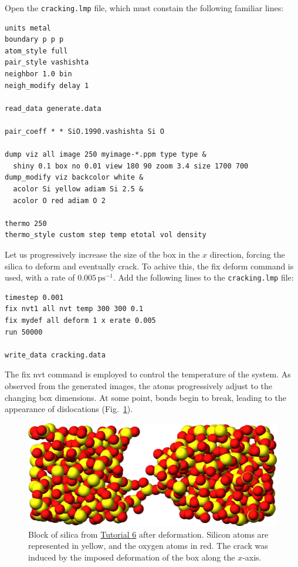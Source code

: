 \documentclass[9pt,tutorial]{livecoms}
\newcommand{\lmpcmd}[1]{\hspace{0pt}\colorbox{listing}{\textcolor{command}{\small{#1}}}\hspace{0pt}} %
\newcommand{\flecmd}[1]{\textcolor{command}{\texttt{#1}}} %
\begin{document}
Open the \flecmd{cracking.lmp} file, which must constain the following familiar lines:
\begin{lstlisting}
units metal
boundary p p p
atom_style full
pair_style vashishta
neighbor 1.0 bin
neigh_modify delay 1

read_data generate.data

pair_coeff * * SiO.1990.vashishta Si O

dump viz all image 250 myimage-*.ppm type type &
  shiny 0.1 box no 0.01 view 180 90 zoom 3.4 size 1700 700
dump_modify viz backcolor white &
  acolor Si yellow adiam Si 2.5 &
  acolor O red adiam O 2

thermo 250
thermo_style custom step temp etotal vol density
\end{lstlisting}

Let us progressively increase the size of the box in the $x$ direction,
forcing the silica to deform and eventually crack.  To achive this,
the \lmpcmd{fix deform} command is used, with a rate
of $0.005\,\text{ps}^{-1}$.  Add the following lines to
the \flecmd{cracking.lmp} file:
\begin{lstlisting}
timestep 0.001
fix nvt1 all nvt temp 300 300 0.1
fix mydef all deform 1 x erate 0.005
run 50000

write_data cracking.data
\end{lstlisting}
The \lmpcmd{fix nvt} command is employed to control the temperature of the system.
As observed from the generated images, the atoms
progressively adjust to the changing box dimensions. At some point, bonds begin to break,
leading to the appearance of dislocations (Fig.~\ref{fig:GCMC-cracked}).

\begin{figure}
\centering
\includegraphics[width=\linewidth]{GCMC-cracked}
\caption{Block of silica from \hyperref[gcmc-silica-label]{Tutorial 6}
after deformation.  Silicon atoms are represented in yellow,
and the oxygen atoms in red.  The crack was induced by the
imposed deformation of the box along the $x$-axis.}
\label{fig:GCMC-cracked}
\end{figure}
\end{document}
